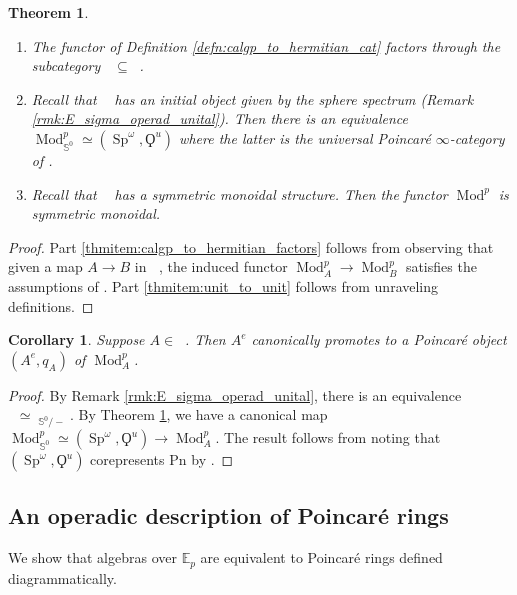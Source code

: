 \documentclass{article}
\DeclareMathOperator{\CAlgp}{CAlg^p} %
\DeclareMathOperator{\Cath}{Cat^h_\infty} %
\DeclareMathOperator{\Catp}{Cat^p_\infty} %
\DeclareMathOperator{\Catpidem}{Cat^p_{\infty, idem}} %
\DeclareMathOperator{\Mod}{Mod} %
\DeclareMathOperator{\Spectra}{Sp} %
\newcommand{\sphere}{\mathbb{S}^0}
\newtheorem{theorem}[equation]{Theorem}
\newtheorem{corollary}[equation]{Corollary}
\theoremstyle{definition}
\newcommand{\Lucy}[1]{\todo[color=cyan!30]{\footnotesize L: #1}}
\begin{document}
\begin{theorem}\label{thm:calgp_to_poincare_cat}
\begin{enumerate}[label=(\arabic*)]
    \item \label{thmitem:calgp_to_hermitian_factors} The functor of Definition \ref{defn:calgp_to_hermitian_cat} factors through the subcategory $ \Catp \subseteq \Cath $. 
    \item \label{thmitem:unit_to_unit} Recall that $ \CAlgp $ has an initial object given by the sphere spectrum (Remark \ref{rmk:E_sigma_operad_unital}). 
    Then there is an equivalence $ \Mod^p_{\sphere} \simeq \left(\Spectra^\omega,\Qoppa^u\right) $ where the latter is the universal Poincaré $ \infty $-category of \cite[\S4.1]{CDHHLMNNSI}. 
    \item Recall that $ \Catpidem $ has a symmetric monoidal structure. 
    Then the functor $ \Mod^p $ is symmetric monoidal. \Lucy{to-do! Use \cite[Example 5.1.6]{CDHHLMNNSI}?}
\end{enumerate}
\end{theorem}
\begin{proof}
    Part \ref{thmitem:calgp_to_hermitian_factors} follows from observing that given a map $ A \to B $ in $ \CAlgp $, the induced functor $ \Mod^p_A \to \Mod^p_B $ satisfies the assumptions of \cite[Lemma 3.4.3]{CDHHLMNNSI}. 
    Part \ref{thmitem:unit_to_unit} follows from unraveling definitions. 
\end{proof}
\begin{corollary}
    Suppose $ A \in \CAlgp $. 
    Then $ A^e $ canonically promotes to a Poincaré object $ (A^e, q_A) $ of $ \Mod^p_A $. 
\end{corollary}
\begin{proof}
    By Remark \ref{rmk:E_sigma_operad_unital}, there is an equivalence $ \CAlgp \simeq \CAlgp_{\sphere/-} $. 
    By Theorem \ref{thm:calgp_to_poincare_cat}, we have a canonical map $ \Mod^p_{\sphere} \simeq \left(\Spectra^\omega,\Qoppa^u\right) \to \Mod^p_A $. 
    The result follows from noting that $ \left(\Spectra^\omega,\Qoppa^u\right) $ corepresents $ \mathrm{Pn} $ by \cite[Proposition 4.1.3]{CDHHLMNNSI}. 
\end{proof}

\subsection{An operadic description of Poincaré rings}
We show that algebras over $ \mathbb{E}_p $ are equivalent to Poincaré rings defined diagrammatically. 
\end{document}
